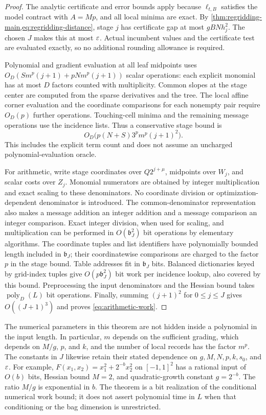 \begin{proof}
The analytic certificate and error bounds apply because
$\ell_{t,B}$ satisfies the model contract with $A=Mp$, and all local
minima are exact.  By \cref{thm:regridding-main,eq:regridding-distance}, stage
$j$ has certificate gap at most $gBNh_j^2$.  The chosen $J$ makes this at
most $\varepsilon$.  Actual incumbent values and the certificate test are evaluated
exactly, so no additional rounding allowance is required.

Polynomial and gradient evaluation at all leaf midpoints uses
$O_D(Sm^p(j+1)+pNm^p(j+1))$ scalar operations: each explicit monomial has
at most $D$ factors counted with multiplicity.  Common slopes at the stage
center are computed from the sparse derivatives and the tree.  The local
affine corner evaluation and the coordinate comparisons for each nonempty
pair require $O_D(p)$ further operations.  Touching-cell minima and the
remaining message operations use the incidence lists.  Thus a conservative
stage bound is
\[
 O_D\bigl(p(N+S)3^p m^p(j+1)^2\bigr).
\]
This includes the explicit term count and does not assume an uncharged
polynomial-evaluation oracle.

For arithmetic, write stage coordinates over $Q2^{j+\mu}$, midpoints over
$W_j$, and scalar costs over $Z_j$.  Monomial numerators are obtained by
integer multiplication and exact scaling to these denominators.  No
coordinate division or optimization-dependent denominator is introduced.
The common-denominator representation also makes a message addition an
integer addition and a message comparison an integer comparison.  Exact
integer division, when used for scaling, and multiplication can be performed
in $O(\mathfrak b_J^2)$ bit operations by elementary algorithms.  The
coordinate tuples and list identifiers have polynomially bounded length
included in $\mathfrak b_J$; their coordinatewise comparisons are charged
to the factor $p$ in the stage bound. Table addresses fit in
$\mathfrak b_J$ bits. Balanced dictionaries keyed by grid-index tuples
give $O(p\mathfrak b_J^2)$ bit work per incidence lookup, also covered
by this bound. Preprocessing the input denominators
and the Hessian bound takes $\operatorname{poly}_D(L)$ bit operations.
Finally, summing $(j+1)^2$ for $0\le j\le J$ gives
$O((J+1)^3)$ and proves \cref{eq:arithmetic-work}.
\end{proof}

The numerical parameters in this theorem are not hidden inside a polynomial
in the input length.  In particular, $m$ depends on the sufficient grading,
which depends on $M/g$, $p$, and $k$, and the number of local records has the
factor $m^p$.  The constants in $J$ likewise retain their stated dependence
on $g,M,N,p,k,s_0$, and $\varepsilon$.  For example,
$F(x_1,x_2)=x_1^2+2^{-b}x_2^2$ on $[-1,1]^2$ has a rational input of
$O(b)$ bits, Hessian bound $M=2$, and quadratic-growth constant $g=2^{-b}$.
The ratio $M/g$ is exponential in $b$.  The theorem is a bit realization
of the conditional numerical work bound; it does not assert polynomial time
in $L$ when that conditioning or the bag dimension is unrestricted.

